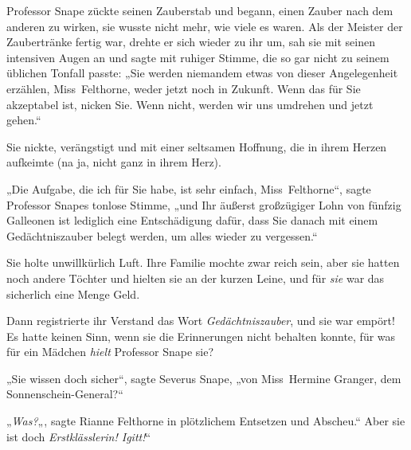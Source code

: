Professor Snape zückte seinen Zauberstab und begann, einen Zauber nach dem anderen zu wirken, sie wusste nicht mehr, wie viele es waren. Als der Meister der Zaubertränke fertig war, drehte er sich wieder zu ihr um, sah sie mit seinen intensiven Augen an und sagte mit ruhiger Stimme, die so gar nicht zu seinem üblichen Tonfall passte: „Sie werden niemandem etwas von dieser Angelegenheit erzählen, Miss~Felthorne, weder jetzt noch in Zukunft. Wenn das für Sie akzeptabel ist, nicken Sie. Wenn nicht, werden wir uns umdrehen und jetzt gehen.“

Sie nickte, verängstigt und mit einer seltsamen Hoffnung, die in ihrem Herzen aufkeimte (na ja, nicht ganz in ihrem Herz).

„Die Aufgabe, die ich für Sie habe, ist sehr einfach, Miss~Felthorne“, sagte Professor Snapes tonlose Stimme, „und Ihr äußerst großzügiger Lohn von fünfzig Galleonen ist lediglich eine Entschädigung dafür, dass Sie danach mit einem Gedächtniszauber belegt werden, um alles wieder zu vergessen.“

Sie holte unwillkürlich Luft. Ihre Familie mochte zwar reich sein, aber sie hatten noch andere Töchter und hielten sie an der kurzen Leine, und für \emph{sie} war das sicherlich eine Menge Geld.

Dann registrierte ihr Verstand das Wort \emph{Gedächtniszauber}, und sie war empört! Es hatte keinen Sinn, wenn sie die Erinnerungen nicht behalten konnte, für was für ein Mädchen \emph{hielt} Professor Snape sie?

„Sie wissen doch sicher“, sagte Severus Snape, „von Miss~Hermine Granger, dem Sonnenschein-General?“

„\emph{Was?}„, sagte Rianne Felthorne in plötzlichem Entsetzen und Abscheu.“ Aber sie ist doch \emph{Erstklässlerin! Igitt!}“

